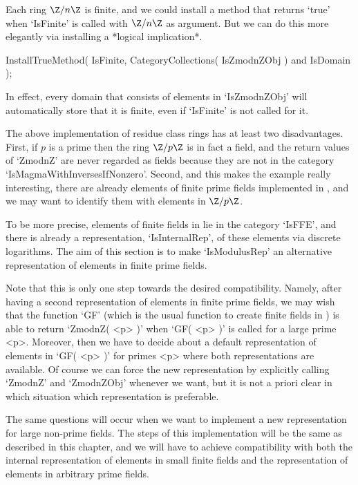 Each ring $\Z/n\Z$ is finite,
and we could install a method that returns `true' when `IsFinite' is
called with $\Z/n\Z$ as argument.
But we can do this more elegantly via installing a *logical implication*.

\begintt
    InstallTrueMethod( IsFinite,
        CategoryCollections( IsZmodnZObj ) and IsDomain );
\endtt

In effect, every domain that consists of elements in `IsZmodnZObj'
will automatically store that it is finite,
even if `IsFinite' is not called for it.



The above implementation of residue class rings has at least two
disadvantages.
First, if $p$ is a prime then the ring $\Z/p\Z$ is in fact a field,
and the return values of `ZmodnZ' are never regarded as fields because
they are not in the category `IsMagmaWithInversesIfNonzero'.
Second, and this makes the example really interesting,
there are already elements of finite prime fields implemented in {\GAP},
and we may want to identify them with elements in $\Z/p\Z$.

To be more precise,
elements of finite fields in {\GAP} lie in the category `IsFFE',
and there is already a representation, `IsInternalRep', of these elements
via discrete logarithms.
The aim of this section is to make `IsModulusRep' an alternative
representation of elements in finite prime fields.

Note that this is only one step towards the desired compatibility.
Namely, after having a second representation of elements in finite
prime fields, we may wish that the function `GF' (which is the usual
function to create finite fields in {\GAP}) is able to return
`ZmodnZ( <p> )' when `GF( <p> )' is called for a large prime <p>.
Moreover, then we have to decide about a default representation of
elements in `GF( <p> )' for primes <p> where both representations are
available.
Of course we can force the new representation by explicitly calling
`ZmodnZ' and `ZmodnZObj' whenever we want, but it is not a priori
clear in which situation which representation is preferable.

The same questions will occur when we want to implement a new
representation for large non-prime fields.
The steps of this implementation will be the same as described in this
chapter,
and we will have to achieve compatibility with both the internal
representation of elements in small finite fields and the representation
of elements in arbitrary prime fields.


